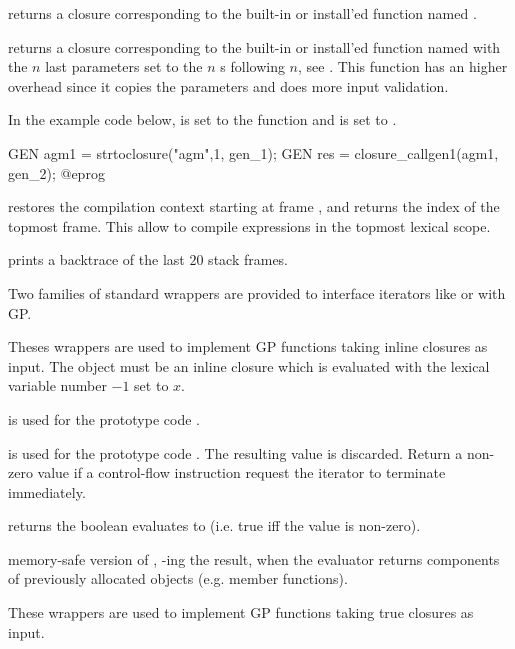  returns a closure corresponding to the
built-in or install'ed function named .

 returns a closure
corresponding to the built-in or install'ed function named  with the
$n$ last parameters set to the $n$ s following $n$, see
. This function has an higher overhead since it copies the
parameters and does more input validation.

In the example code below,  is set to the function
 and  is set to .

\bprog
  GEN agm1 = strtoclosure("agm",1, gen_1);
  GEN res = closure_callgen1(agm1, gen_2);
@eprog

 restores the compilation context starting
at frame , and returns the index of the topmost frame. This allow to
compile expressions in the topmost lexical scope.

 prints a backtrace of the last $20$ stack frames.

Two families of standard wrappers are provided to interface iterators like
 or  with GP.

Theses wrappers are used to implement GP functions taking inline closures as
input. The object  must be an inline closure which is evaluated
with the lexical variable number $-1$ set to $x$.

 is used for the prototype code .

 is used for the prototype code
. The resulting value is discarded.  Return a non-zero value if a
control-flow instruction request the iterator to terminate immediately.

 returns the boolean
 evaluates to (i.e. true iff the value is non-zero).

 memory-safe version of ,
-ing the result, when the evaluator returns components of
previously allocated objects (e.g. member functions).

These wrappers are used to implement GP functions taking true closures as
input.


